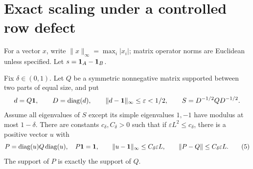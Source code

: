 \section{Exact scaling under a controlled row defect}
\label{sec:scaling}
For a vector \(x\), write \(\|x\|_\infty=\max_i|x_i|\);
matrix operator norms are Euclidean unless specified.
Let \(s=\mathbf1_A-\mathbf1_B\).

\begin{lemma}
\label{lem:scaling}
Fix \(\delta\in(0,1)\).
Let \(Q\) be a symmetric nonnegative matrix supported between
two parts of equal size, and put
\[
 d=Q\mathbf1,\qquad D=\operatorname{diag}(d),\qquad
 \|d-\mathbf1\|_\infty\leq\varepsilon<1/2,\qquad
 S=D^{-1/2}QD^{-1/2}.
\]
Assume all eigenvalues of \(S\) except its simple eigenvalues
\(1,-1\) have modulus at most \(1-\delta\).
There are constants \(c_\delta,C_\delta>0\) such that if
\(\varepsilon L^2\leq c_\delta\), there is a positive vector
\(u\) with
\[
 P=\operatorname{diag}(u)Q\operatorname{diag}(u),\quad P\mathbf1=\mathbf1,\qquad
 \|u-\mathbf1\|_\infty\leq C_\delta\varepsilon L,\qquad
 \|P-Q\|\leq C_\delta\varepsilon L.                           \tag{5}
\]
The support of \(P\) is exactly the support of \(Q\).
\end{lemma}

